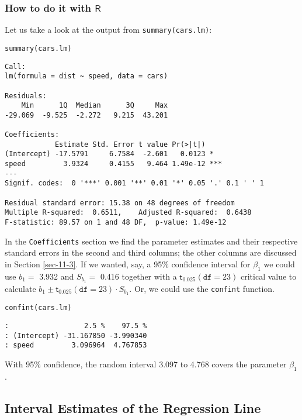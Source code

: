\subsubsection{How to do it with \(\mathsf{R}\)}
\label{sec-11-2-4-1}

Let us take a look at the output from \texttt{summary(cars.lm)}:

\begin{verbatim}
summary(cars.lm)
\end{verbatim}

\begin{verbatim}
Call:
lm(formula = dist ~ speed, data = cars)

Residuals:
    Min      1Q  Median      3Q     Max 
-29.069  -9.525  -2.272   9.215  43.201 

Coefficients:
            Estimate Std. Error t value Pr(>|t|)    
(Intercept) -17.5791     6.7584  -2.601   0.0123 *  
speed         3.9324     0.4155   9.464 1.49e-12 ***
---
Signif. codes:  0 '***' 0.001 '**' 0.01 '*' 0.05 '.' 0.1 ' ' 1

Residual standard error: 15.38 on 48 degrees of freedom
Multiple R-squared:  0.6511,	Adjusted R-squared:  0.6438 
F-statistic: 89.57 on 1 and 48 DF,  p-value: 1.49e-12
\end{verbatim}

In the \texttt{Coefficients} section we find the parameter estimates and
their respective standard errors in the second and third columns; the
other columns are discussed in Section \ref{sec-11-3}. If we
wanted, say, a 95\% confidence interval for \(\beta_{1}\) we could use
\( b_{1} = \) 3.932 and \( S_{b_{1}} = \) 
0.416 together with a \( \mathsf{t}_{0.025}(\mathtt{df}=23) \)
critical value to calculate \( b_{1} \pm
\mathsf{t}_{0.025}(\mathtt{df} = 23) \cdot S_{b_{1}} \).  Or, we could
use the \texttt{confint} function.

\begin{verbatim}
confint(cars.lm)
\end{verbatim}

\begin{verbatim}
:                  2.5 %    97.5 %
: (Intercept) -31.167850 -3.990340
: speed         3.096964  4.767853
\end{verbatim}

With 95\% confidence, the random interval 3.097 to
4.768 covers the parameter \(\beta_{1}\).

\subsection{Interval Estimates of the Regression Line}
\label{sec-11-2-5}

